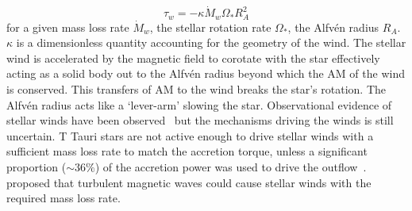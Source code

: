 \documentclass[fleqn,usenatbib]{mnras}
\begin{document}
\begin{equation}
    \tau_{w} = -\kappa \dot{M}_{w} \Omega_{\ast} R_A^2
    \label{eq:wind_torque}
\end{equation}
for a given mass loss rate $\dot{M}_{w}$, the stellar rotation rate $\Omega_{\ast}$, the Alfv\'en radius $R_A$. $\kappa$ is a dimensionless quantity accounting for the geometry of the wind. The stellar wind is accelerated by the magnetic field to corotate with the star effectively acting as a solid body out to the Alfv\'en radius beyond which the AM of the wind is conserved. This transfers of AM to the wind breaks the star's rotation. The Alfv\'en radius acts like a `lever-arm' slowing the star. Observational evidence of stellar winds have been observed~\citep[e.g.][]{2003ApJ...599L..41E,2006ApJ...646..319E} but the mechanisms driving the winds is still uncertain. T Tauri stars are not active enough to drive stellar winds with a sufficient mass loss rate to match the accretion torque, unless a significant proportion ($\sim 36\%$) of the accretion power was used to drive the outflow~\citep{2009A&A...508.1117Z,Matt:2008ic}. \citet{2008ApJ...689..316C} proposed that turbulent magnetic waves could cause stellar winds with the required mass loss rate.
\end{document}

